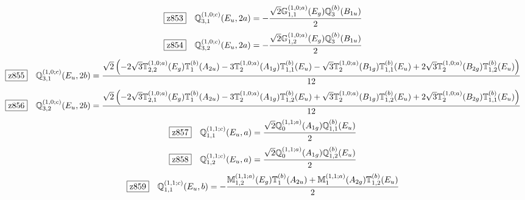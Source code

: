 \documentclass[fleqn,10pt,landscape]{jsarticle}
\begin{document}
\begin{dmath*}
\hspace*{3mm}\fbox{z853}\quad \mathbb{Q}_{3,1}^{(1,0;c)}(E_{u},2a)=- \frac{\sqrt{2} \mathbb{G}_{1,1}^{(1,0;a)}(E_{g}) \mathbb{Q}_{3}^{(b)}(B_{1u})}{2}
\end{dmath*}
\begin{dmath*}
\hspace*{3mm}\fbox{z854}\quad \mathbb{Q}_{3,2}^{(1,0;c)}(E_{u},2a)=- \frac{\sqrt{2} \mathbb{G}_{1,2}^{(1,0;a)}(E_{g}) \mathbb{Q}_{3}^{(b)}(B_{1u})}{2}
\end{dmath*}
\begin{dmath*}
\hspace*{3mm}\fbox{z855}\quad \mathbb{Q}_{3,1}^{(1,0;c)}(E_{u},2b)=\frac{\sqrt{2} \left(- 2 \sqrt{3} \mathbb{T}_{2,2}^{(1,0;a)}(E_{g}) \mathbb{T}_{1}^{(b)}(A_{2u}) - 3 \mathbb{T}_{2}^{(1,0;a)}(A_{1g}) \mathbb{T}_{1,1}^{(b)}(E_{u}) - \sqrt{3} \mathbb{T}_{2}^{(1,0;a)}(B_{1g}) \mathbb{T}_{1,1}^{(b)}(E_{u}) + 2 \sqrt{3} \mathbb{T}_{2}^{(1,0;a)}(B_{2g}) \mathbb{T}_{1,2}^{(b)}(E_{u})\right)}{12}
\end{dmath*}
\begin{dmath*}
\hspace*{3mm}\fbox{z856}\quad \mathbb{Q}_{3,2}^{(1,0;c)}(E_{u},2b)=\frac{\sqrt{2} \left(- 2 \sqrt{3} \mathbb{T}_{2,1}^{(1,0;a)}(E_{g}) \mathbb{T}_{1}^{(b)}(A_{2u}) - 3 \mathbb{T}_{2}^{(1,0;a)}(A_{1g}) \mathbb{T}_{1,2}^{(b)}(E_{u}) + \sqrt{3} \mathbb{T}_{2}^{(1,0;a)}(B_{1g}) \mathbb{T}_{1,2}^{(b)}(E_{u}) + 2 \sqrt{3} \mathbb{T}_{2}^{(1,0;a)}(B_{2g}) \mathbb{T}_{1,1}^{(b)}(E_{u})\right)}{12}
\end{dmath*}
\begin{dmath*}
\hspace*{3mm}\fbox{z857}\quad \mathbb{Q}_{1,1}^{(1,1;c)}(E_{u},a)=\frac{\sqrt{2} \mathbb{Q}_{0}^{(1,1;a)}(A_{1g}) \mathbb{Q}_{1,1}^{(b)}(E_{u})}{2}
\end{dmath*}
\begin{dmath*}
\hspace*{3mm}\fbox{z858}\quad \mathbb{Q}_{1,2}^{(1,1;c)}(E_{u},a)=\frac{\sqrt{2} \mathbb{Q}_{0}^{(1,1;a)}(A_{1g}) \mathbb{Q}_{1,2}^{(b)}(E_{u})}{2}
\end{dmath*}
\begin{dmath*}
\hspace*{3mm}\fbox{z859}\quad \mathbb{Q}_{1,1}^{(1,1;c)}(E_{u},b)=- \frac{\mathbb{M}_{1,2}^{(1,1;a)}(E_{g}) \mathbb{T}_{1}^{(b)}(A_{2u}) + \mathbb{M}_{1}^{(1,1;a)}(A_{2g}) \mathbb{T}_{1,2}^{(b)}(E_{u})}{2}
\end{dmath*}
\end{document}
